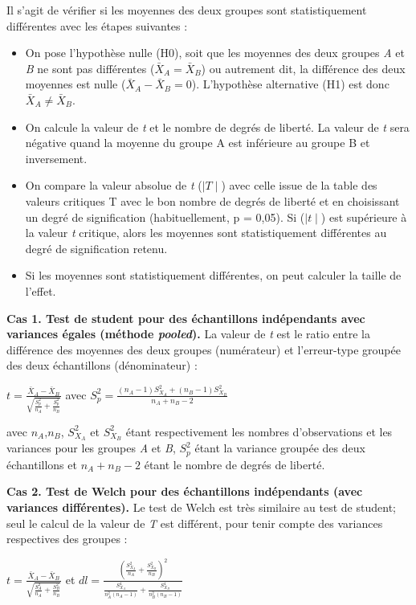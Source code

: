 \documentclass[
  11pt,
  french,
]{book}
\providecommand{\tightlist}{%
  \setlength{\itemsep}{0pt}\setlength{\parskip}{0pt}}
\begin{document}
Il s'agit de vérifier si les moyennes des deux groupes sont statistiquement différentes avec les étapes suivantes :

\begin{itemize}
\tightlist
\item
  On pose l'hypothèse nulle (H0), soit que les moyennes des deux groupes \emph{A} et \emph{B} ne sont pas différentes (\(\bar{X}_{A}=\bar{X}_{B}\)) ou autrement dit, la différence des deux moyennes est nulle (\(\bar{X}_{A}-\bar{X}_{B}=0\)). L'hypothèse alternative (H1) est donc \(\bar{X}_{A}\ne\bar{X}_{B}\).
\item
  On calcule la valeur de \emph{t} et le nombre de degrés de liberté. La valeur de \emph{t} sera négative quand la moyenne du groupe A est inférieure au groupe B et inversement.
\item
  On compare la valeur absolue de \emph{t} (\(\mid T \mid\)) avec celle issue de la table des valeurs critiques T avec le bon nombre de degrés de liberté et en choisissant un degré de signification (habituellement, p = 0,05). Si (\(\mid t \mid\)) est supérieure à la valeur \emph{t} critique, alors les moyennes sont statistiquement différentes au degré de signification retenu.
\item
  Si les moyennes sont statistiquement différentes, on peut calculer la taille de l'effet.
\end{itemize}

\textbf{Cas 1. Test de student pour des échantillons indépendants avec variances égales (méthode \emph{pooled}).} La valeur de \emph{t} est le ratio entre la différence des moyennes des deux groupes (numérateur) et l'erreur-type groupée des deux échantillons (dénominateur) :

\(t = \frac{\bar{X}_{A}-\bar{X}_{B}}{\sqrt{\frac{S^2_p}{n_A}+\frac{S^2_p}{n_B}}}\) avec
\(S^2_p = \frac{(n_A-1)S^2_{X_A}+(n_B-1)S^2_{X_B}}{n_A+n_B-2}\)

avec \(n_A\),\(n_B\), \(S^2_{X_A}\) et \(S^2_{X_B}\) étant respectivement les nombres d'observations et les variances pour les groupes \emph{A} et \emph{B}, \(S^2_p\) étant la variance groupée des deux échantillons et \(n_A+n_B-2\) étant le nombre de degrés de liberté.

\textbf{Cas 2. Test de Welch pour des échantillons indépendants (avec variances différentes).} Le test de Welch est très similaire au test de student; seul le calcul de la valeur de \emph{T} est différent, pour tenir compte des variances respectives des groupes :

\(t = \frac{\bar{X}_{A}-\bar{X}_{B}}{\sqrt{\frac{S^2_A}{n_A}+\frac{S^2_B}{n_B}}}\) et \(dl = \frac{ \left( \frac{S^2_{X_A}}{n_A}+\frac{S^2_{X_B}}{n_B} \right)^2} {\frac{S^4_{X_A}}{n^2_A(n_A-1)}+\frac{S^4_{X_B}}{n^2_B(n_B-1)}}\)
\end{document}

